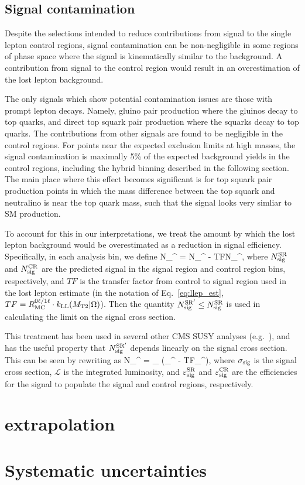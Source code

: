 \subsection{Signal contamination}
Despite the selections intended to reduce contributions from signal to the single lepton control
regions, signal contamination can be non-negligible in some regions of phase space where the
signal is kinematically similar to the background. A contribution from signal to the control
region would result in an overestimation of the lost lepton background.

The only signals which show potential contamination issues are those with prompt lepton decays. 
Namely, gluino pair production where the gluinos decay to top quarks, and direct top squark pair production where the squarks decay to top quarks. 
The contributions from other signals are found to be negligible in the control
regions. For points near the expected exclusion limits at high masses, the signal contamination
is maximally 5\% of the expected background yields in the control regions, including the hybrid \mttwo binning described in the following section. 
The main place where this effect becomes significant is for top squark pair production points
in which the mass difference between the top squark and neutralino is near the top quark mass, such that the
signal looks very simliar to SM \ttbar production.

To account for this in our interpretations, we treat the amount by which the lost lepton background 
would be overestimated as a reduction in signal efficiency. Specifically, in each analysis bin, we define
\be
N_^ = N_^ - TF\cdot N_^,
\ee
where $N_{\mathrm{sig}}^{\mathrm{SR}}$ and $N_{\mathrm{sig}}^{\mathrm{CR}}$ are the predicted signal in the signal region and control region bins,
respectively, and $TF$ is the transfer factor from control to signal region used in the lost lepton estimate (in
the notation of Eq.~\ref{eq:llep_est}, $TF=R_{\mathrm{MC}}^{0\ell/1\ell}\cdot k_{\mathrm{LL}}(M_{\mathrm{T2}}|\Omega)$).
Then the quantity $N_{\mathrm{sig}}^{\mathrm{SR'}}\leq N_{\mathrm{sig}}^{\mathrm{SR}}$ is used in calculating the limit on the
signal cross section.

This treatment has been used in several other CMS SUSY analyses (e.g.~\cite{SUS_stop1l}),
and has the useful property that $N_{\mathrm{sig}}^{\mathrm{SR'}}$ depends linearly on the signal cross section. 
This can be seen by rewriting as
\be
N_^ = \sigma_\cdot{}\cdot
(\varepsilon_^ - TF\cdot\varepsilon_^),
\ee
where $\sigma_{\mathrm{sig}}$ is the signal cross section, $\mathcal{L}$ is the integrated luminosity, and
$\varepsilon_{\mathrm{sig}}^{\mathrm{SR}}$ and $\varepsilon_{\mathrm{sig}}^{\mathrm{CR}}$ are the efficiencies for the signal to
populate the signal and control regions, respectively.

\section{\texorpdfstring{\mttwo}{MT2} extrapolation}
\label{sec:llep_mt2}

\section{Systematic uncertainties}
\label{sec:llep_syst}
